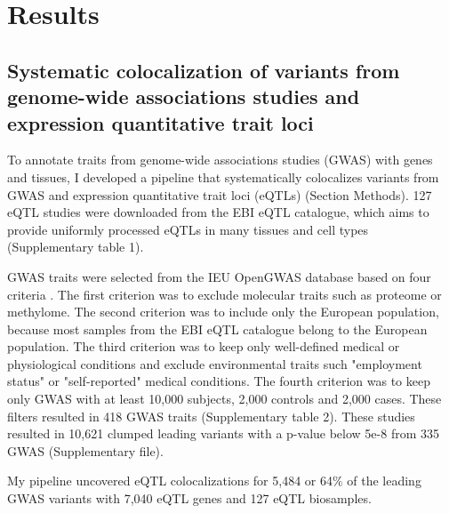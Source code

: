 \section*{Results}\label{s:results}

%
\subsection*{Systematic colocalization of variants from genome-wide associations studies and expression quantitative trait loci}
%

To annotate traits from genome-wide associations studies (GWAS) with genes and tissues,
I developed a pipeline that systematically colocalizes variants from GWAS and expression quantitative trait loci (eQTLs) (Section Methods).
%
127 eQTL studies were downloaded from the EBI eQTL catalogue, which aims to provide uniformly processed eQTLs in many
tissues and cell types \citep{2021.Alasoo.Kerimov} (Supplementary table 1).

GWAS traits were selected from the IEU OpenGWAS database based on four criteria \citep{2018.Parkinson.Buniello}.
%
The first criterion was to exclude molecular traits such as proteome or methylome.
%	
The second criterion was to include only the European population, because most
samples from the EBI eQTL catalogue belong to the European population.
%
The third criterion was to keep only well-defined medical or physiological
conditions and exclude environmental traits such "employment status" or "self-reported" medical conditions.
%
The fourth criterion was to keep only GWAS with at least 10,000 subjects, 2,000 controls and 2,000 cases.
%
These filters resulted in 418 GWAS traits (Supplementary table 2).
%
These studies resulted in 10,621 clumped leading variants with a p-value below 5e-8 from 335 GWAS (Supplementary file).

My pipeline uncovered eQTL colocalizations for 5,484 or 64$\%$ of the leading GWAS variants with 7,040 eQTL genes and 127 eQTL biosamples.



